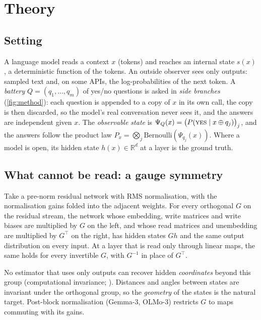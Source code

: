 \section{Theory}
\label{sec:method}


\subsection{Setting}
\label{sec:setting}
A language model reads a context $x$ (tokens) and reaches an internal state $s(x)$, a deterministic function of the tokens. An outside observer sees only outputs: sampled text and, on some APIs, the log-probabilities of the next token. A \emph{battery} $Q=(q_1,\dots,q_m)$ of yes/no questions is asked in \emph{side branches} (\cref{fig:method}): each question is appended to a copy of $x$ in its own call, the copy is then discarded, so the model's real conversation never sees it, and the answers are independent given $x$. The \emph{observable state} is $\Psi_Q(x)=\big(P(\textsc{yes}\mid x\oplus q_j)\big)_j$, and the answers follow the product law $P_x=\bigotimes_j\mathrm{Bernoulli}(\Psi_{q_j}(x))$. Where a model is open, its hidden state $h(x)\in\mathbb{R}^d$ at a layer is the ground truth.

\subsection{What cannot be read: a gauge symmetry}
\begin{proposition}[gauge]\label{prop:gauge}
Take a pre-norm residual network with RMS normalisation, with the normalisation gains folded into the adjacent weights. For every orthogonal $G$ on the residual stream, the network whose embedding, write matrices and write biases are multiplied by $G$ on the left, and whose read matrices and unembedding are multiplied by $G^{\top}$ on the right, has hidden states $G h$ and the same output distribution on every input. At a layer that is read only through linear maps, the same holds for every invertible $G$, with $G^{-1}$ in place of $G^{\top}$.
\end{proposition}
No estimator that uses only outputs can recover hidden \emph{coordinates} beyond this group (computational invariance; \citealp{ashkboos2024slicegpt}). Distances and angles between states are invariant under the orthogonal group, so the \emph{geometry} of the states is the natural target. Post-block normalisation (Gemma-3, OLMo-3) restricts $G$ to maps commuting with its gains.

